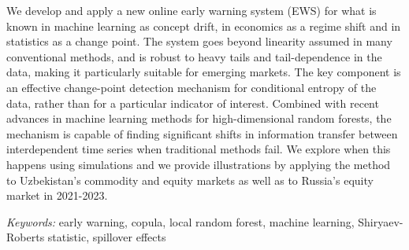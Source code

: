 \noindent We develop and apply a new online early warning system (EWS) for what is known in machine learning as concept drift, in economics as a regime shift and in statistics as a change point. The system goes beyond linearity assumed in many conventional methods, and is robust to heavy tails and tail-dependence in the data, making it particularly suitable for emerging markets. The key component is an effective change-point detection mechanism for conditional entropy of the data, rather than for a particular indicator of interest. Combined with recent advances in machine learning methods for high-dimensional random forests, the mechanism is capable of finding significant shifts in information transfer between interdependent time series when traditional methods fail. We explore when this happens using simulations and we provide illustrations by applying the method to Uzbekistan's commodity and equity markets as well as to Russia's equity market in 2021-2023. 

\bigskip
\noindent\emph{Keywords:} early warning, copula, local random forest, machine learning, Shiryaev-Roberts statistic, spillover effects